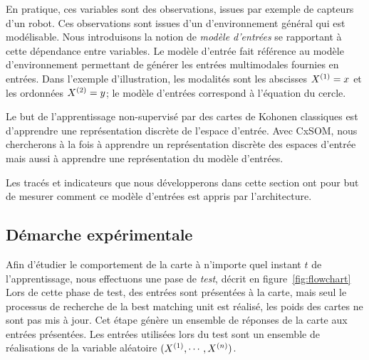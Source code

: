 En pratique, ces variables sont des observations, issues par exemple de capteurs d'un robot. Ces observations sont issues d'un d'environnement général qui est modélisable. 
Nous introduisons la notion de \emph{modèle d'entrées} se rapportant à cette dépendance entre variables.
Le modèle d'entrée fait référence au modèle d'environnement permettant de générer les entrées multimodales fournies en entrées. Dans l'exemple d'illustration, les modalités sont les abscisses $X^{({1})} = x$ et les ordonnées $X^{({2})} = y$; le modèle d'entrées correspond à l'équation du cercle.

Le but de l'apprentissage non-supervisé par des cartes de Kohonen classiques est d'apprendre une représentation discrète de l'espace d'entrée.
Avec CxSOM, nous chercherons à la fois à apprendre un représentation discrète des espaces d'entrée mais aussi à apprendre une représentation du modèle d'entrées.

Les tracés et indicateurs que nous développerons dans cette section ont pour but de mesurer comment ce modèle d'entrées est appris par l'architecture. 

\subsection{Démarche expérimentale}

Afin d'étudier le comportement de la carte à n'importe quel instant $t$ de l'apprentissage, nous effectuons une pase de \emph{test}, décrit en figure~\ref{fig:flowchart}
Lors de cette phase de test, des entrées sont présentées à la carte, mais seul le processus de recherche de la best matching unit est réalisé, les poids des cartes ne sont pas mis à jour. Cet étape génère un ensemble de réponses de la carte aux entrées présentées.
Les entrées utilisées lors du test sont un ensemble de réalisations de la variable aléatoire $(X^{({1})}, \cdots, X^{({n})})$.


